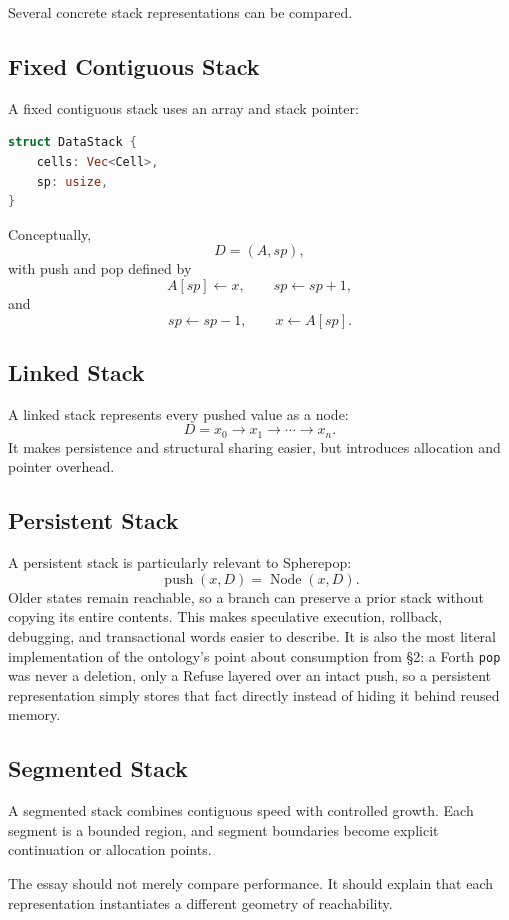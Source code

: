 \documentclass[12pt]{article}
\begin{document}
Several concrete stack representations can be compared.

\subsection{Fixed Contiguous Stack}
A fixed contiguous stack uses an array and stack pointer:
\begin{lstlisting}[language=Rust]
struct DataStack {
    cells: Vec<Cell>,
    sp: usize,
}
\end{lstlisting}

Conceptually,
\[
D=(A,sp),
\]
with push and pop defined by
\[
A[sp]\gets x,\qquad sp\gets sp+1,
\]
and
\[
sp\gets sp-1,\qquad x\gets A[sp].
\]

\subsection{Linked Stack}
A linked stack represents every pushed value as a node:
\[
D = x_0 \to x_1 \to \cdots \to x_n.
\]
It makes persistence and structural sharing easier, but introduces allocation and pointer overhead.

\subsection{Persistent Stack}
A persistent stack is particularly relevant to Spherepop:
\[
\operatorname{push}(x,D)=\operatorname{Node}(x,D).
\]
Older states remain reachable, so a branch can preserve a prior stack without copying its entire contents. This makes speculative execution, rollback, debugging, and transactional words easier to describe. It is also the most literal implementation of the ontology's point about consumption from \S 2: a Forth \texttt{pop} was never a deletion, only a Refuse layered over an intact push, so a persistent representation simply stores that fact directly instead of hiding it behind reused memory.

\subsection{Segmented Stack}
A segmented stack combines contiguous speed with controlled growth. Each segment is a bounded region, and segment boundaries become explicit continuation or allocation points.

The essay should not merely compare performance. It should explain that each representation instantiates a different geometry of reachability.
\end{document}

